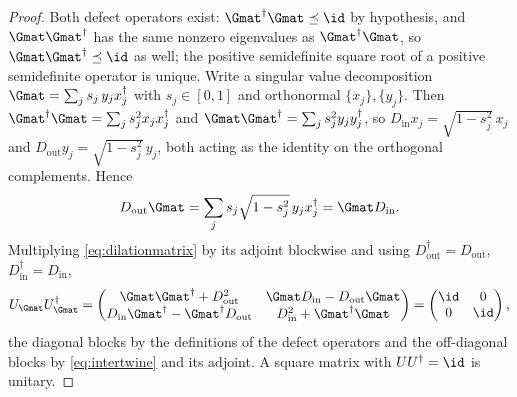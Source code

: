 \begin{proof}
Both defect operators exist: $\Gmat^\dagger\Gmat\preceq\id$ by hypothesis, and
$\Gmat\Gmat^\dagger$ has the same nonzero eigenvalues as
$\Gmat^\dagger\Gmat$, so $\Gmat\Gmat^\dagger\preceq\id$ as well; the positive
semidefinite square root of a positive semidefinite operator is unique. Write a
singular value decomposition $\Gmat=\sum_js_j\,y_jx_j^\dagger$ with
$s_j\in[0,1]$ and orthonormal $\{x_j\},\{y_j\}$. Then
$\Gmat^\dagger\Gmat=\sum_js_j^2x_jx_j^\dagger$ and
$\Gmat\Gmat^\dagger=\sum_js_j^2y_jy_j^\dagger$, so
$D_{\mathrm{in}}x_j=\sqrt{1-s_j^2}\,x_j$ and
$D_{\mathrm{out}}y_j=\sqrt{1-s_j^2}\,y_j$, both acting as the identity on the
orthogonal complements. Hence
\begin{equation}\label{eq:intertwine}
  D_{\mathrm{out}}\Gmat=\sum_js_j\sqrt{1-s_j^2}\,y_jx_j^\dagger
  =\Gmat D_{\mathrm{in}} .
\end{equation}
Multiplying \eqref{eq:dilationmatrix} by its adjoint blockwise and using
$D_{\mathrm{out}}^\dagger=D_{\mathrm{out}}$,
$D_{\mathrm{in}}^\dagger=D_{\mathrm{in}}$,
\begin{equation}
  U_{\Gmat}U_{\Gmat}^\dagger=
  \begin{pmatrix}
    \Gmat\Gmat^\dagger+D_{\mathrm{out}}^2 &
    \Gmat D_{\mathrm{in}}-D_{\mathrm{out}}\Gmat\\
    D_{\mathrm{in}}\Gmat^\dagger-\Gmat^\dagger D_{\mathrm{out}} &
    D_{\mathrm{in}}^2+\Gmat^\dagger\Gmat
  \end{pmatrix}
  =\begin{pmatrix}\id&0\\0&\id\end{pmatrix},
\end{equation}
the diagonal blocks by the definitions of the defect operators and the
off-diagonal blocks by \eqref{eq:intertwine} and its adjoint. A square matrix
with $U U^\dagger=\id$ is unitary.
\end{proof}

